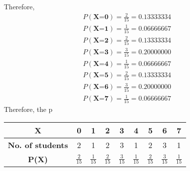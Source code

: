 \documentclass[journal,12pt,twocolumn]{IEEEtran}
\begin{document}
Therefore, 
\begin{align*}
    P(\textbf{X=0}) = \frac {2}{15} = 0.13333334
   \\ P(\textbf{X=1}) = \frac {1}{15} = 0.06666667
   \\ P(\textbf{X=2}) = \frac {2}{15} = 0.13333334
   \\ P(\textbf{X=3}) = \frac {3}{15} = 0.20000000
   \\P(\textbf{X=4}) = \frac {1}{15} = 0.06666667
   \\ P(\textbf{X=5}) = \frac {2}{15} = 0.13333334
   \\ P(\textbf{X=6}) = \frac {3}{15} = 0.20000000
   \\ P(\textbf{X=7}) = \frac {1}{15} = 0.06666667
\end{align*}
Therefore, the p
\begin{center}
\begin{tabular}{|c|c|c|c|c|c|c|c|c|}
\hline
\textbf{X} & 0 & 1 & 2 & 3 & 4 & 5 & 6 & 7 \\
\hline
\textbf{No. of students} & 2 & 1 & 2 & 3 & 1 & 2 & 3 & 1 \\
\hline
\textbf{P(X)} & $\frac {2}{15}$ & $\frac {1}{15}$ & $\frac {2}{15}$ & $\frac {3}{15}$ & $\frac {1}{15}$ & $\frac {2}{15}$ & $\frac {3}{15}$ & $\frac {1}{15}$ \\
\hline 
\end{tabular}
\end{center}
\end{document}
